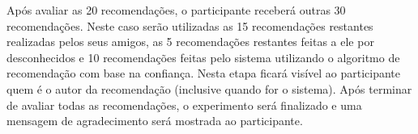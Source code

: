  Após avaliar as 20 recomendações, o participante receberá outras 30 recomendações. Neste caso serão utilizadas as 15 recomendações restantes realizadas pelos seus amigos, as 5 recomendações restantes feitas a ele por desconhecidos e 10 recomendações feitas pelo sistema utilizando o algoritmo de recomendação com base na confiança. Nesta etapa ficará visível ao participante quem é o autor da recomendação (inclusive quando for o sistema). Após terminar de avaliar todas as recomendações, o experimento será finalizado e uma mensagem de agradecimento será mostrada ao participante.
